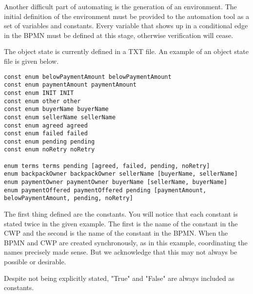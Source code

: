 
Another difficult part of automating is the generation of an environment. The initial definition of the environment must be provided to the automation tool as a set of variables and constants. Every variable that shows up in a conditional edge in the BPMN must be defined at this stage, otherwise verification will cease.

The object state is currently defined in a TXT file. An example of an object state file is given below.
%
{\small
\begin{lstlisting}[style=myTXT]
const enum belowPaymentAmount belowPaymentAmount
const enum paymentAmount paymentAmount
const enum INIT INIT
const enum other other
const enum buyerName buyerName
const enum sellerName sellerName
const enum agreed agreed
const enum failed failed
const enum pending pending
const enum noRetry noRetry

enum terms terms pending [agreed, failed, pending, noRetry]
enum backpackOwner backpackOwner sellerName [buyerName, sellerName]
enum paymentOwner paymentOwner buyerName [sellerName, buyerName]
enum paymentOffered paymentOffered pending [paymentAmount, belowPaymentAmount, pending, noRetry]
\end{lstlisting}
}
%
The first thing defined are the constants. You will notice that each constant is stated twice in the given example. The first is the name of the constant in the CWP and the second is the name of the constant in the BPMN. When the BPMN and CWP are created synchronously, as in this example, coordinating the names precisely made sense. But we acknowledge that this may not always be possible or desirable.

Despite not being explicitly stated, "True" and "False" are always included as constants. 

